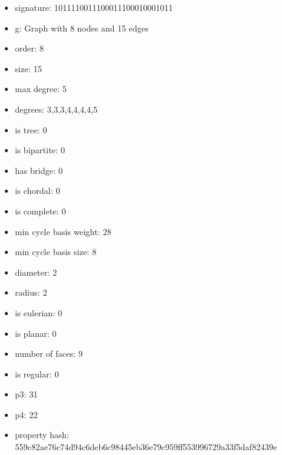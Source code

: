 \begin{itemize}
\item signature: 1011110011100011100010001011
\item g: Graph with 8 nodes and 15 edges
\item order: 8
\item size: 15
\item max degree: 5
\item degrees: 3,3,3,4,4,4,4,5
\item is tree: 0
\item is bipartite: 0
\item has bridge: 0
\item is chordal: 0
\item is complete: 0
\item min cycle basis weight: 28
\item min cycle basis size: 8
\item diameter: 2
\item radius: 2
\item is eulerian: 0
\item is planar: 0
\item number of faces: 9
\item is regular: 0
\item p3: 31
\item p4: 22
\item property hash: 559c82ae76c74d94c6deb6c98445eb36e79c959ff553996729a33f5daf82439e
\end{itemize}
\newpage
\begin{figure}
\end{figure}
